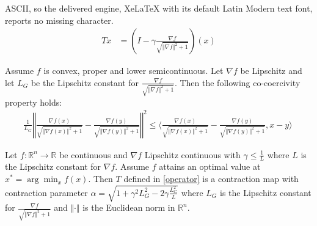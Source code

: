 \documentclass[10pt,a4paper]{amsart}
\begin{document}
ASCII, so the delivered engine, XeLaTeX with its default Latin Modern text font, reports no missing character.
\begin{align}\label{operator}
  Tx  &= \left( I - \gamma\frac{\nabla f}{\sqrt{\Vert \nabla f \Vert^2 + 1} } \right) (x)
\end{align}

\begin{lemma}[Co-coercivity]\label{cocoer}
Assume $f$ is convex, proper and lower semicontinuous.
Let $\nabla f$ be Lipschitz and let $L_G$ be the Lipschitz constant for 
$\displaystyle \frac{\nabla f}{\sqrt{\Vert \nabla f \Vert^2 + 1}}$. 
Then the following co-coercivity property holds:
\begin{align}
\frac{1}{L_G}\left\Vert \frac{\nabla f(x)}{\sqrt{\Vert\nabla f(x)\Vert^2 +1}} - \frac{\nabla f(y)}{\sqrt{\Vert\nabla f(y) \Vert^2 +1}} \right\Vert^2 \leq \bigg \langle \frac{\nabla f(x)}{\sqrt{\Vert\nabla f(x)\Vert^2 +1}}- \frac{\nabla f(y)}{\sqrt{\Vert\nabla f(y)\Vert^2 +1}},x-y \bigg\rangle\
\end{align}
\end{lemma}

\begin{theorem}
Let $f:\mathbb{R}^n \to \mathbb{R}$ be continuous and $\nabla f$ Lipschitz continuous with $\gamma \le \frac{1}{L} $ where $L$ is the Lipschitz constant for $\nabla f$. Assume $f$ attains an optimal value at $x^* = \arg\min_x f(x)$. Then $T$ defined in \eqref{operator} is a contraction map with contraction parameter $\alpha = \sqrt{1 + \gamma^2 L_G^2 - 2\gamma \frac{L_G^2}{L}}$ where $L_G$ is the Lipschitz constant for 
$\displaystyle \frac{\nabla f}{\sqrt{\Vert \nabla f \Vert^2 + 1}} $ and $\Vert \cdot \Vert$ is the Euclidean norm in $\mathbb{R}^n$.
\end{theorem}
\end{document}
